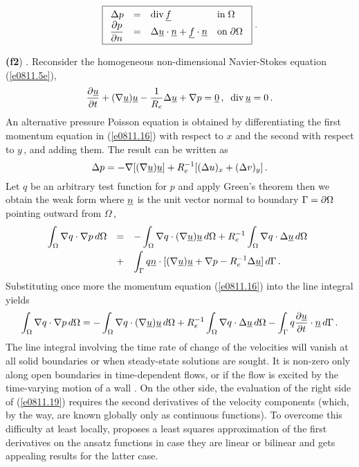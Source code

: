 \documentclass[12pt,a4paper,USenglish,twoside]{book}
\begin{document}
%
\[
\fbox{$\
\ba{.}{rcll}
\Delta p &=& \div \f &\mbox{in} \; \Omega\\
\dis \frac{\da p}{\da n} &=&
 \Delta \u\cdot \n + \f\cdot \n  & \mbox{on} \; \da \Omega
\ea{.}
$}\;.
\]
%
\par
{\bf (f2}) \cite{Sohn}. Reconsider the homogeneous non-dimensional {\sc Navier-Sto\-kes} 
equation (\ref{e0811.5e}),
%
\begin{equation}\label{e0811.16}
\frac{\da\u}{\da t} + (\nabla \u)\u
 - \frac{1}{R_e}\Delta \u + \nabla p = \ul{0}\,,\;\; \div \u = 0\,. 
\end{equation}
%
An alternative pressure {\sc Poisson} equation is obtained by differentiating
the first momentum equation in (\ref{e0811.16}) with respect to $x$ and the second 
with respect to $y$\,, and adding them. The result can be written as
%
\begin{equation}\label{e0811.17}
\Delta p = - \nabla[(\nabla \u)\u] + R_e^{-1}[(\Delta u)_x + (\Delta v)_y]\,.
\end{equation}
%
Let $q$ be an arbitrary test function for $p$ and apply {\sc Green}'s theorem then we 
obtain the weak form where $\n$ is the unit vector normal to boundary $\Gamma = \da 
\Omega$ pointing outward from $\Omega$\,,
%
\begin{equation}\label{e0811.18}
\ba{.}{lll} \dis
\int_{\Omega}\nabla q\cdot \nabla p \, d\Omega
&=& \dis - \int_{\Omega}\nabla q \cdot (\nabla \u)\u\, d\Omega
+ R_e^{-1}\int_{\Omega}\nabla q\cdot \Delta \u\, d \Omega\\[2ex]
&+& \dis  \int_{\Gamma}q\n\cdot[(\nabla \u)\u + \nabla p
 - R_e^{-1}\Delta \u]\, d \Gamma\,.
\ea{.}
\end{equation}
%
Substituting once more the momentum equation (\ref{e0811.16}) into the line integral
yields
%
\begin{equation}\label{e0811.19}
\int_{\Omega}\nabla q\cdot \nabla p \, d\Omega
= - \int_{\Omega}\nabla q \cdot (\nabla \u)\u\, d\Omega
+ R_e^{-1}\int_{\Omega}\nabla q\cdot \Delta \u\, d \Omega
-\int_{\Gamma}q \frac{\da \u}{\da t} \cdot \n\, d\Gamma\,.
\end{equation}
%
The line integral involving the time rate of change of the velocities will 
vanish at all solid boundaries or when steady-state solutions are sought. It is non-zero 
only along open boundaries in time-dependent flows, or if the flow is excited by the 
time-varying motion of a wall \cite{Sohn}. On the other side, the evaluation of the 
right side of (\ref{e0811.19}) requires the second derivatives of the velocity 
components (which, by the way, are known globally only as continuous functions). To 
overcome this difficulty at least locally, \cite{Sohn} 
proposes a least squares approximation of the first derivatives on the ansatz functions 
in case they are linear or bilinear and gets appealing results for the latter case.   
\end{document}
